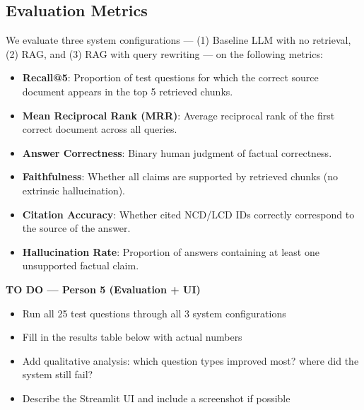 \documentclass[12pt, letterpaper]{article}
\begin{document}
\subsection{Evaluation Metrics}

We evaluate three system configurations --- (1) Baseline LLM with no retrieval,
(2) RAG, and (3) RAG with query rewriting --- on the following metrics:

\begin{itemize}[noitemsep, topsep=4pt]
    \item \textbf{Recall@5}: Proportion of test questions for which the correct source
          document appears in the top 5 retrieved chunks.
    \item \textbf{Mean Reciprocal Rank (MRR)}: Average reciprocal rank of the first
          correct document across all queries.
    \item \textbf{Answer Correctness}: Binary human judgment of factual correctness.
    \item \textbf{Faithfulness}: Whether all claims are supported by retrieved chunks
          (no extrinsic hallucination).
    \item \textbf{Citation Accuracy}: Whether cited NCD/LCD IDs correctly correspond
          to the source of the answer.
    \item \textbf{Hallucination Rate}: Proportion of answers containing at least one
          unsupported factual claim.
\end{itemize}

\begin{todobox}
\textbf{TO DO --- Person 5 (Evaluation + UI)}

\begin{itemize}[noitemsep, topsep=4pt]
    \item Run all 25 test questions through all 3 system configurations
    \item Fill in the results table below with actual numbers
    \item Add qualitative analysis: which question types improved most? where did
          the system still fail?
    \item Describe the Streamlit UI and include a screenshot if possible
\end{itemize}
\end{todobox}
\end{document}
